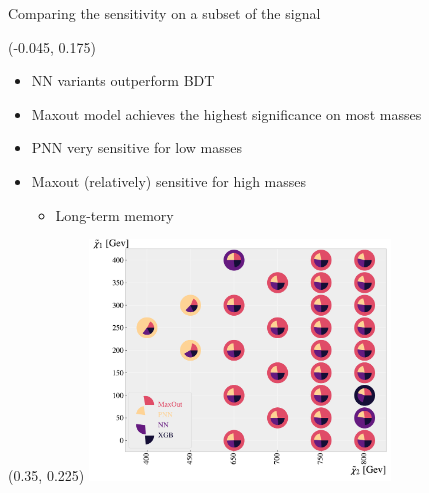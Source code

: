 \documentclass[UKenglish]{beamer}
\begin{document}

\begin{frame}{Comparing the sensitivity on a subset of the signal}
    \begin{textblock}{0.4}(-0.045, 0.175)
        \begin{itemize}
            \item NN variants outperform BDT
            \item Maxout model achieves the highest significance on most masses
            \item PNN very sensitive for low masses 
            \item Maxout (relatively) sensitive for high masses 
            \begin{itemize}
                \item Long-term memory
            \end{itemize}
        \end{itemize}
    \end{textblock}
    \begin{textblock}{1}(0.35, 0.225)
    \includegraphics[width=0.6\textwidth]{figures/Comps/GenPlussXGBNetworkComp.pdf}
    \end{textblock}
\end{frame}
\end{document}

